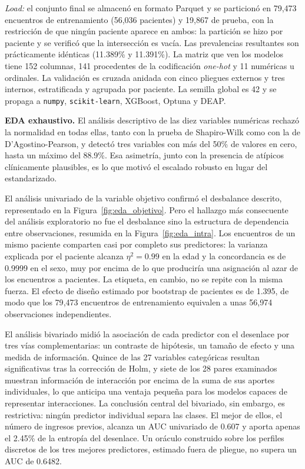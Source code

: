 \documentclass[pdflatex,sn-mathphys-num]{sn-jnl}
\begin{document}
\emph{Load:} el conjunto final se almacenó en formato Parquet y se particionó en 79{,}473 encuentros de entrenamiento (56{,}036 pacientes) y 19{,}867 de prueba, con la restricción de que ningún paciente aparece en ambos: la partición se hizo por paciente y se verificó que la intersección es vacía. Las prevalencias resultantes son prácticamente idénticas (11.389\% y 11.391\%). La matriz que ven los modelos tiene 152 columnas, 141 procedentes de la codificación \emph{one-hot} y 11 numéricas u ordinales. La validación es cruzada anidada con cinco pliegues externos y tres internos, estratificada y agrupada por paciente. La semilla global es 42 y se propaga a \texttt{numpy}, \texttt{scikit-learn}, XGBoost, Optuna y DEAP.

\textbf{EDA exhaustivo.} El análisis descriptivo de las diez variables numéricas rechazó la normalidad en todas ellas, tanto con la prueba de Shapiro-Wilk como con la de D'Agostino-Pearson, y detectó tres variables con más del 50\% de valores en cero, hasta un máximo del 88.9\%. Esa asimetría, junto con la presencia de atípicos clínicamente plausibles, es lo que motivó el escalado robusto en lugar del estandarizado.

El análisis univariado de la variable objetivo confirmó el desbalance descrito, representado en la Figura~\ref{fig:eda_objetivo}. Pero el hallazgo más consecuente del análisis exploratorio no fue el desbalance sino la estructura de dependencia entre observaciones, resumida en la Figura~\ref{fig:eda_intra}. Los encuentros de un mismo paciente comparten casi por completo sus predictores: la varianza explicada por el paciente alcanza $\eta^2 = 0.99$ en la edad y la concordancia es de 0.9999 en el sexo, muy por encima de lo que produciría una asignación al azar de los encuentros a pacientes. La etiqueta, en cambio, no se repite con la misma fuerza. El efecto de diseño estimado por bootstrap de pacientes es de 1.395, de modo que los 79{,}473 encuentros de entrenamiento equivalen a unas 56{,}974 observaciones independientes.

El análisis bivariado midió la asociación de cada predictor con el desenlace por tres vías complementarias: un contraste de hipótesis, un tamaño de efecto y una medida de información. Quince de las 27 variables categóricas resultan significativas tras la corrección de Holm, y siete de los 28 pares examinados muestran información de interacción por encima de la suma de sus aportes individuales, lo que anticipa una ventaja pequeña para los modelos capaces de representar interacciones. La conclusión central del bivariado, sin embargo, es restrictiva: ningún predictor individual separa las clases. El mejor de ellos, el número de ingresos previos, alcanza un AUC univariado de 0.607 y aporta apenas el 2.45\% de la entropía del desenlace. Un oráculo construido sobre los perfiles discretos de los tres mejores predictores, estimado fuera de pliegue, no supera un AUC de 0.6482.
\end{document}
